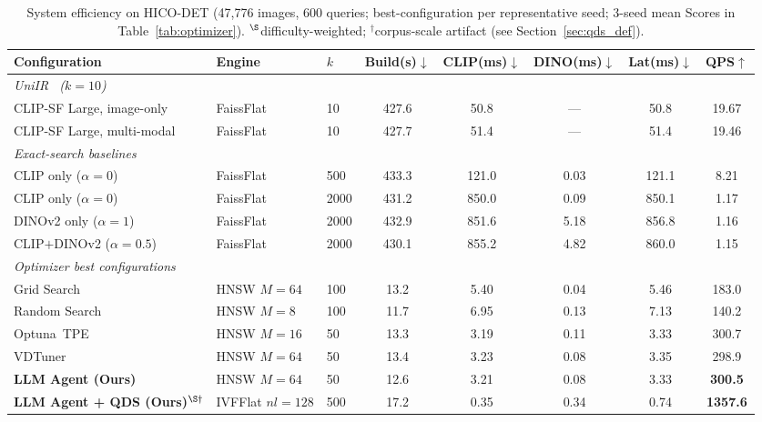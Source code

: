\documentclass[sigconf, nonacm]{acmart}
\theoremstyle{definition}
\begin{document}
\begin{table}[t]
\centering
\caption{System efficiency on HICO-DET (47{,}776 images, 600 queries; best-configuration per representative seed; 3-seed mean Scores in Table~\ref{tab:optimizer}). $^\S$difficulty-weighted; $^\dagger$corpus-scale artifact (see Section~\ref{sec:qds_def}).}
\label{tab:efficiency}
\vspace{3pt}
\small
\setlength{\tabcolsep}{5pt}
\begin{tabular}{lllccccc}
\toprule
\textbf{Configuration} & \textbf{Engine} & \textbf{$k$} & \textbf{Build(s)}$\downarrow$ & \textbf{CLIP(ms)}$\downarrow$ & \textbf{DINO(ms)}$\downarrow$ & \textbf{Lat(ms)}$\downarrow$ & \textbf{QPS}$\uparrow$ \\
\midrule
\multicolumn{8}{l}{\textit{UniIR~\cite{wei2024uniir} ($k{=}10$)}} \\
CLIP-SF Large, image-only         & FaissFlat & 10   & 427.6 & 50.8  & ---   &  50.8 & 19.67 \\
CLIP-SF Large, multi-modal         & FaissFlat & 10   & 427.7 & 51.4  & ---   &  51.4 & 19.46 \\
\midrule
\multicolumn{8}{l}{\textit{Exact-search baselines}} \\
CLIP only ($\alpha{=}0$)          & FaissFlat & 500  & 433.3 & 121.0 & 0.03  & 121.1 & 8.21 \\
CLIP only ($\alpha{=}0$)          & FaissFlat & 2000 & 431.2 & 850.0 & 0.09  & 850.1 & 1.17 \\
DINOv2 only ($\alpha{=}1$)        & FaissFlat & 2000 & 432.9 & 851.6 & 5.18  & 856.8 & 1.16 \\
CLIP$+$DINOv2 ($\alpha{=}0.5$)   & FaissFlat & 2000 & 430.1 & 855.2 & 4.82  & 860.0 & 1.15 \\
\midrule
\multicolumn{8}{l}{\textit{Optimizer best configurations}} \\
Grid Search                  & HNSW $M{=}64$        & 100 &  13.2 &  5.40 & 0.04 &  5.46 &  183.0 \\
Random Search~\cite{bergstra2012random} & HNSW $M{=}8$ & 100 &  11.7 &  6.95 & 0.13 &  7.13 &  140.2 \\
Optuna~TPE~\cite{akiba2019optuna} & HNSW $M{=}16$   &  50 &  13.3 &  3.19 & 0.11 &  3.33 &  300.7 \\
VDTuner~\cite{yang2024vdtuner}   & HNSW $M{=}64$   &  50 &  13.4 &  3.23 & 0.08 &  3.35 &  298.9 \\
\textbf{LLM Agent (Ours)}    & HNSW $M{=}64$        &  50 &  12.6 &  3.21 & 0.08 &  3.33 & \textbf{300.5} \\
\textbf{LLM Agent + QDS (Ours)}$^{\S\dagger}$ & IVFFlat $nl{=}128$ & 500 &  17.2 &  0.35 & 0.34 &  0.74 & \textbf{1357.6} \\
\bottomrule
\end{tabular}
\end{table}
\end{document}
